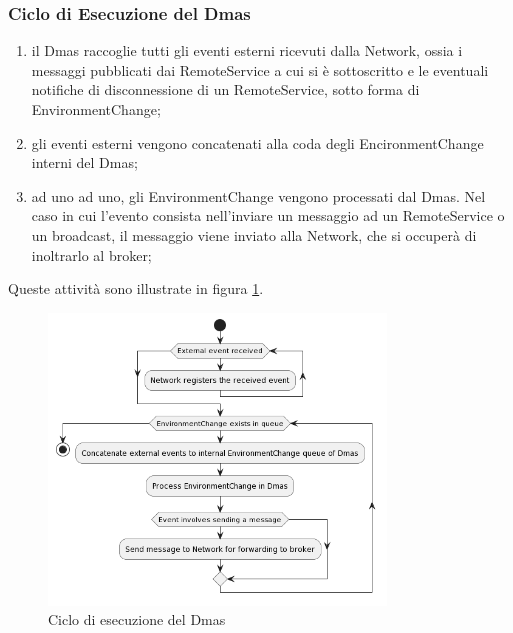 \subsubsection{Ciclo di Esecuzione del Dmas}

\begin{enumerate}
    \item il Dmas raccoglie tutti gli eventi esterni ricevuti dalla Network, ossia i messaggi pubblicati dai RemoteService a cui si è sottoscritto e le eventuali notifiche di disconnessione di un RemoteService, sotto forma di EnvironmentChange;
    \item gli eventi esterni vengono concatenati alla coda degli EncironmentChange interni del Dmas;
    \item ad uno ad uno, gli EnvironmentChange vengono processati dal Dmas. Nel caso in cui l'evento consista nell'inviare un messaggio ad un RemoteService o un broadcast, il messaggio viene inviato alla Network, che si occuperà di inoltrarlo al broker;
\end{enumerate}

Queste attività sono illustrate in figura \ref{fig:execution}.

\begin{figure}
    \centering
    \includegraphics[width=0.8\textwidth]{figures/activity-applychanges.png}
    \caption{Ciclo di esecuzione del Dmas}
    \label{fig:execution}
\end{figure}

